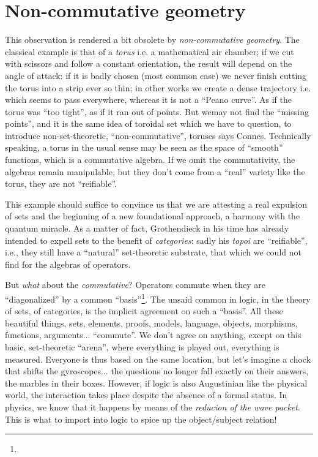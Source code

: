 \documentclass{article}
\begin{document}
\section{Non-commutative geometry}
This observation is rendered a bit obsolete by \emph{non-commutative geometry}. The classical example is that of a \emph{torus} i.e. a mathematical air chamber; if we cut with scissors and follow a constant orientation, the result will depend on the angle of attack: if it is badly chosen (most common case) we never finish cutting the torus into a strip ever so thin; in other works we create a dense trajectory i.e. which seems to pass everywhere, whereas it is not a \enquote{Peano curve}. As if the torus was \enquote{too tight}, as if it ran out of points. But wemay not find the \enquote{missing points}, and it is the same idea of toroidal set which we have to question, to introduce non-set-theoretic, \enquote{non-commutative}, toruses says Connes. Technically speaking, a torus in the usual sense may be seen as the space of \enquote{smooth} functions, which is a commutative algebra. If we omit the commutativity, the algebras remain manipulable, but they don't come from a \enquote{real} variety like the torus, they are not \enquote{reifiable}.

This example should suffice to convince us that we are attesting a real expulsion of sets and the beginning of a new foundational approach, a harmony with the quantum miracle. As a matter of fact, Grothendieck in his time has already intended to expell sets to the benefit of \emph{categories}: sadly his \emph{topoi} are \enquote{reifiable}, i.e., they still have a \enquote{natural} set-theoretic substrate, that which we could not find for the algebras of operators.


But \emph{what} about the \emph{commutative}? Operators commute when they are \enquote{diagonalized} by a common \enquote{basis}\footnote{}. The unsaid common in logic, in the theory of sets, of categories, is the implicit agreement on such a \enquote{basis}. All these beautiful things, sets, elements, proofs, models, language, objects, morphisms, functions, arguments... \enquote{commute}. We don't agree on anything, except on this basic, set-theoretic \enquote{arena}, where everything is played out, everything is measured. Everyone is thus based on the same location, but let's imagine a chock that shifts the gyroscopes... the questions no longer fall exactly on their answers, the marbles in their boxes. However, if logic is also Augustinian like the physical world, the interaction takes place despite the absence of a formal status. In physics, we know that it happens by means of the \emph{reducion of the wave packet}. This is what to import into logic to spice up the object/subject relation!
\end{document}
